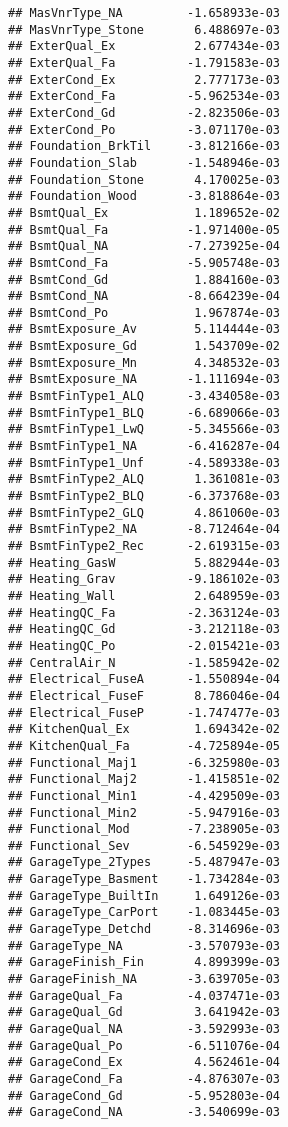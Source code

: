 \documentclass[
]{article}
\begin{document}
\begin{verbatim}
## MasVnrType_NA         -1.658933e-03
## MasVnrType_Stone       6.488697e-03
## ExterQual_Ex           2.677434e-03
## ExterQual_Fa          -1.791583e-03
## ExterCond_Ex           2.777173e-03
## ExterCond_Fa          -5.962534e-03
## ExterCond_Gd          -2.823506e-03
## ExterCond_Po          -3.071170e-03
## Foundation_BrkTil     -3.812166e-03
## Foundation_Slab       -1.548946e-03
## Foundation_Stone       4.170025e-03
## Foundation_Wood       -3.818864e-03
## BsmtQual_Ex            1.189652e-02
## BsmtQual_Fa           -1.971400e-05
## BsmtQual_NA           -7.273925e-04
## BsmtCond_Fa           -5.905748e-03
## BsmtCond_Gd            1.884160e-03
## BsmtCond_NA           -8.664239e-04
## BsmtCond_Po            1.967874e-03
## BsmtExposure_Av        5.114444e-03
## BsmtExposure_Gd        1.543709e-02
## BsmtExposure_Mn        4.348532e-03
## BsmtExposure_NA       -1.111694e-03
## BsmtFinType1_ALQ      -3.434058e-03
## BsmtFinType1_BLQ      -6.689066e-03
## BsmtFinType1_LwQ      -5.345566e-03
## BsmtFinType1_NA       -6.416287e-04
## BsmtFinType1_Unf      -4.589338e-03
## BsmtFinType2_ALQ       1.361081e-03
## BsmtFinType2_BLQ      -6.373768e-03
## BsmtFinType2_GLQ       4.861060e-03
## BsmtFinType2_NA       -8.712464e-04
## BsmtFinType2_Rec      -2.619315e-03
## Heating_GasW           5.882944e-03
## Heating_Grav          -9.186102e-03
## Heating_Wall           2.648959e-03
## HeatingQC_Fa          -2.363124e-03
## HeatingQC_Gd          -3.212118e-03
## HeatingQC_Po          -2.015421e-03
## CentralAir_N          -1.585942e-02
## Electrical_FuseA      -1.550894e-04
## Electrical_FuseF       8.786046e-04
## Electrical_FuseP      -1.747477e-03
## KitchenQual_Ex         1.694342e-02
## KitchenQual_Fa        -4.725894e-05
## Functional_Maj1       -6.325980e-03
## Functional_Maj2       -1.415851e-02
## Functional_Min1       -4.429509e-03
## Functional_Min2       -5.947916e-03
## Functional_Mod        -7.238905e-03
## Functional_Sev        -6.545929e-03
## GarageType_2Types     -5.487947e-03
## GarageType_Basment    -1.734284e-03
## GarageType_BuiltIn     1.649126e-03
## GarageType_CarPort    -1.083445e-03
## GarageType_Detchd     -8.314696e-03
## GarageType_NA         -3.570793e-03
## GarageFinish_Fin       4.899399e-03
## GarageFinish_NA       -3.639705e-03
## GarageQual_Fa         -4.037471e-03
## GarageQual_Gd          3.641942e-03
## GarageQual_NA         -3.592993e-03
## GarageQual_Po         -6.511076e-04
## GarageCond_Ex          4.562461e-04
## GarageCond_Fa         -4.876307e-03
## GarageCond_Gd         -5.952803e-04
## GarageCond_NA         -3.540699e-03

\end{verbatim}
\end{document}
